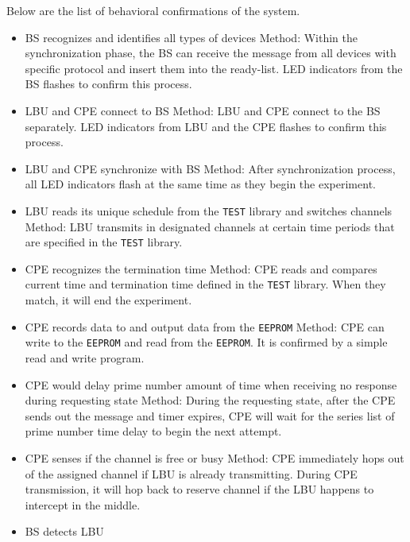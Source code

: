 Below are the list of behavioral confirmations of the system.

\begin{itemize}
  \item BS recognizes and identifies all types of devices\newline
  Method: Within the synchronization phase, the BS can receive the message from all devices with specific protocol and insert them into the ready-list. LED indicators from the BS flashes to confirm this process.
  \item LBU and CPE connect to BS \newline
  Method: LBU and CPE connect to the BS separately. LED indicators from LBU and the CPE flashes to confirm this process.
  \item LBU and CPE synchronize with BS\newline
  Method: After synchronization process, all LED indicators flash at the same time as they begin the experiment.
  \item LBU reads its unique schedule from the \texttt{TEST} library and switches channels\newline
  Method: LBU transmits in designated channels at certain time periods that are specified in the \texttt{TEST} library.
  \item CPE recognizes the termination time\newline
  Method: CPE reads and compares current time and termination time defined in the \texttt{TEST} library. When they match, it will end the experiment.
  \item CPE records data to and output data from the \texttt{EEPROM}\newline
  Method: CPE can write to the \texttt{EEPROM} and read from the \texttt{EEPROM}. It is confirmed by a simple read and write program.
  \item CPE would delay prime number amount of time when receiving no response during requesting state\newline
  Method: During the requesting state, after the CPE sends out the message and timer expires, CPE will wait for the series list of prime number time delay to begin the next attempt.
  \item CPE senses if the channel is free or busy\newline
  Method: CPE immediately hops out of the assigned channel if LBU is already transmitting. During CPE transmission, it will hop back to reserve channel if the LBU happens to intercept in the middle.
  \item BS detects LBU\newline

\end{itemize}
